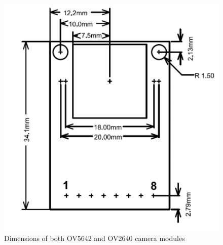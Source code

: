 \begin{figure}[!htbp]
\centering
\includegraphics[width = 0.75 \linewidth]{pics/arducam_mech}
\caption{Dimensions of both OV5642 and OV2640 camera modules}
\label{fig:arducam_mech}
\end{figure}

